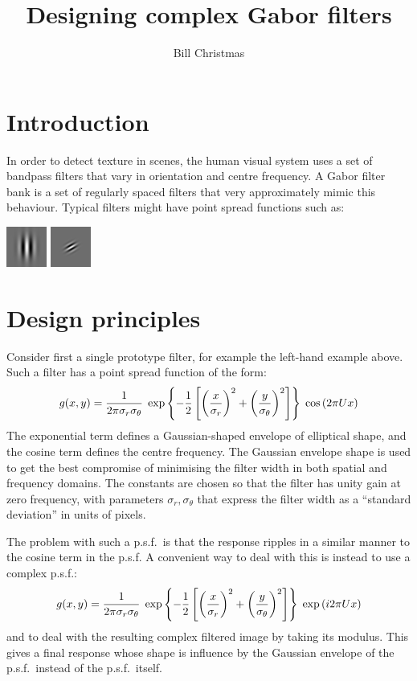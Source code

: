 \documentclass[12pt,a4]{article}
\title{Designing complex Gabor filters}
\author{Bill Christmas}
\begin{document}
\maketitle

\section{Introduction}

In order to detect texture in scenes, the human visual system uses a set of bandpass filters that vary in orientation and centre frequency.  A Gabor filter bank is a set of regularly spaced filters that very approximately mimic this behaviour.  Typical filters might have point spread functions such as:

\begin{center}
  \includegraphics{psf}  \hspace{2cm} \includegraphics{psf45}
\end{center}

\section{Design principles}

Consider first a single prototype filter, for example the left-hand example above.  Such a filter has a point spread function of the form:
\[ g(x,y) = {1 \over 2 \pi  \sigma_r\sigma_\theta}\;
\exp \left\{ -{1\over2} \left[{\left(x\over\sigma_r\right)^2+\left(y \over \sigma_\theta\right)^2}\right]\right\} \;
\cos\left(2\pi U x\right) \]
The exponential term defines a Gaussian-shaped envelope of elliptical shape, and the cosine term defines the centre frequency.  The Gaussian envelope shape is used to get the best compromise of minimising the filter width in both spatial and frequency domains.  The constants are chosen so that the filter has unity gain at zero frequency, with parameters $\sigma_r, \sigma_\theta$ that express the filter width as a ``standard deviation'' in units of pixels.

The problem with such a p.s.f.\ is that the response ripples in a similar manner to the cosine term in the p.s.f.  A convenient way to deal with this is instead to use a complex p.s.f.:
\[ g(x,y) = {1 \over 2 \pi  \sigma_r\sigma_\theta}\;
\exp \left\{ -{1\over2} \left[{\left(x\over\sigma_r\right)^2+\left(y \over \sigma_\theta\right)^2}\right]\right\} \;
\exp\left(i2\pi U x\right) \]
and to deal with the resulting complex filtered image by taking its modulus.  This gives a final response whose shape is influence by the Gaussian envelope of the p.s.f.\ instead of the p.s.f.\ itself.
\end{document}

